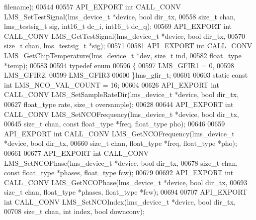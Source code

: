 \begin{DoxyCode}
      filename);
00544 
00557 API_EXPORT \textcolor{keywordtype}{int} CALL_CONV LMS_SetTestSignal(lms\_device\_t *device, \textcolor{keywordtype}{bool} dir_tx,
00558                     \textcolor{keywordtype}{size\_t} chan, lms\_testsig\_t sig, int16\_t dc_i, int16\_t dc_q);
00569 API_EXPORT \textcolor{keywordtype}{int} CALL_CONV LMS_GetTestSignal(lms\_device\_t *device, \textcolor{keywordtype}{bool} dir_tx,
00570                                                \textcolor{keywordtype}{size\_t} chan, lms\_testsig\_t *sig);
00571 
00581 API_EXPORT \textcolor{keywordtype}{int} CALL_CONV LMS_GetChipTemperature(lms\_device\_t *dev, \textcolor{keywordtype}{size\_t} ind,
00582                                                 float\_type *temp);
00583 
00594 \textcolor{keyword}{typedef} \textcolor{keyword}{enum}
00596 \{
00597     LMS_GFIR1 = 0,
00598     LMS_GFIR2,
00599     LMS_GFIR3
00600 \}lms_gfir_t;
00601 
00603 \textcolor{keyword}{static} \textcolor{keyword}{const} \textcolor{keywordtype}{int} LMS_NCO_VAL_COUNT = 16;
00604 
00626 API_EXPORT \textcolor{keywordtype}{int} CALL_CONV LMS_SetSampleRateDir(lms\_device\_t *device, \textcolor{keywordtype}{bool} dir_tx,
00627                                             float\_type rate, \textcolor{keywordtype}{size\_t} oversample);
00628 
00644 API_EXPORT \textcolor{keywordtype}{int} CALL_CONV LMS_SetNCOFrequency(lms\_device\_t *device, \textcolor{keywordtype}{bool} dir_tx,
00645                      \textcolor{keywordtype}{size\_t} chan, \textcolor{keyword}{const} float\_type *freq, float\_type pho);
00646 
00659 API_EXPORT \textcolor{keywordtype}{int} CALL_CONV LMS_GetNCOFrequency(lms\_device\_t *device, \textcolor{keywordtype}{bool} dir_tx,
00660                           \textcolor{keywordtype}{size\_t} chan, float\_type *freq, float\_type *pho);
00661 
00677 API_EXPORT \textcolor{keywordtype}{int} CALL_CONV LMS_SetNCOPhase(lms\_device\_t *device, \textcolor{keywordtype}{bool} dir_tx,
00678                    \textcolor{keywordtype}{size\_t} chan, \textcolor{keyword}{const} float\_type *phases, float\_type fcw);
00679 
00692 API_EXPORT \textcolor{keywordtype}{int} CALL_CONV LMS_GetNCOPhase(lms\_device\_t *device, \textcolor{keywordtype}{bool} dir_tx,
00693                             \textcolor{keywordtype}{size\_t} chan, float\_type *phases, float\_type *fcw);
00694 
00707 API_EXPORT \textcolor{keywordtype}{int} CALL_CONV LMS_SetNCOIndex(lms\_device\_t *device, \textcolor{keywordtype}{bool} dir_tx,
00708                                     \textcolor{keywordtype}{size\_t} chan, \textcolor{keywordtype}{int} index, \textcolor{keywordtype}{bool} downconv);

\end{DoxyCode}
